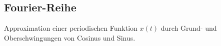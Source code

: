 \documentclass[6pt,a4paper]{scrartcl}
\begin{document}
\begin{multicols}{4}
%	
%	
%	
%	
%	
%		
%
	\section{Fourier-Reihe}
	Approximation einer periodischen Funktion $x(t)$ durch Grund- und Oberschwingungen von Cosinus und Sinus.

\end{multicols}
\end{document}
